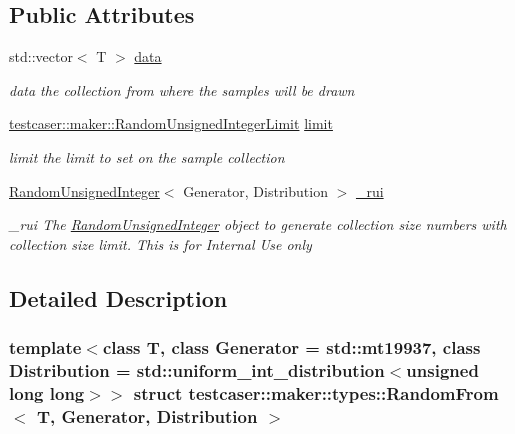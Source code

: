 \subsection*{Public Attributes}
\begin{DoxyCompactItemize}
\item 
std\+::vector$<$ T $>$ \mbox{\hyperlink{structtestcaser_1_1maker_1_1types_1_1RandomFrom_a1f346e06890d0451607551dcb0e3a426}{data}}
\begin{DoxyCompactList}\small\item\em data the collection from where the samples will be drawn \end{DoxyCompactList}\item 
\mbox{\hyperlink{structtestcaser_1_1maker_1_1RandomUnsignedIntegerLimit}{testcaser\+::maker\+::\+Random\+Unsigned\+Integer\+Limit}} \mbox{\hyperlink{structtestcaser_1_1maker_1_1types_1_1RandomFrom_a4701553931d6eafed7f3070fa64924b7}{limit}}
\begin{DoxyCompactList}\small\item\em limit the limit to set on the sample collection \end{DoxyCompactList}\item 
\mbox{\hyperlink{classtestcaser_1_1maker_1_1types_1_1RandomUnsignedInteger}{Random\+Unsigned\+Integer}}$<$ Generator, Distribution $>$ \mbox{\hyperlink{structtestcaser_1_1maker_1_1types_1_1RandomFrom_abf3411be34374535dce67aeecabe0e8c}{\+\_\+rui}}
\begin{DoxyCompactList}\small\item\em \+\_\+rui The \mbox{\hyperlink{classtestcaser_1_1maker_1_1types_1_1RandomUnsignedInteger}{Random\+Unsigned\+Integer}} object to generate collection size numbers with collection size limit. This is for Internal Use only \end{DoxyCompactList}\end{DoxyCompactItemize}


\subsection{Detailed Description}
\subsubsection*{template$<$class T, class Generator = std\+::mt19937, class Distribution = std\+::uniform\+\_\+int\+\_\+distribution$<$unsigned long long$>$$>$\newline
struct testcaser\+::maker\+::types\+::\+Random\+From$<$ T, Generator, Distribution $>$}


